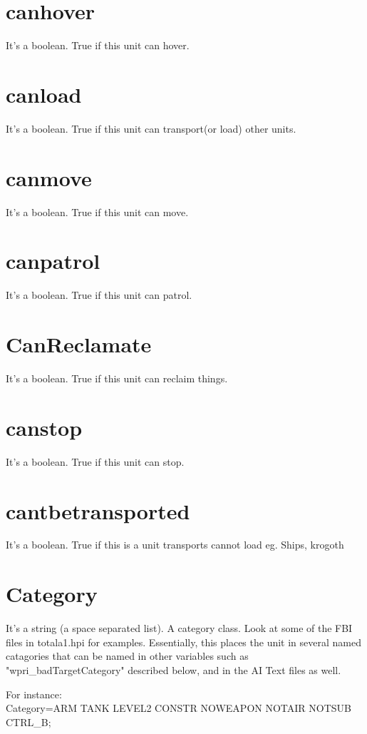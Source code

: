 \documentclass[a4paper,10pt]{article}
\begin{document}
\section{canhover}
It's a boolean. True if this unit can hover.

\section{canload}
It's a boolean. True if this unit can transport(or load) other units.

\section{canmove}
It's a boolean. True if this unit can move.

\section{canpatrol}
It's a boolean. True if this unit can patrol.

\section{CanReclamate}
It's a boolean. True if this unit can reclaim things.

\section{canstop}
It's a boolean. True if this unit can stop.

\section{cantbetransported}
It's a boolean. True if this is a unit transports cannot load eg. Ships, krogoth

\section{Category}
It's a string (a space separated list). A category class. Look at some of the FBI files in totala1.hpi for examples.  Essentially, this places the unit in several named catagories that can be named in other variables such as "wpri\_badTargetCategory" described below, and in the AI Text files as well.

For instance:\\
Category=ARM TANK LEVEL2 CONSTR NOWEAPON NOTAIR NOTSUB CTRL\_B;
\end{document}
